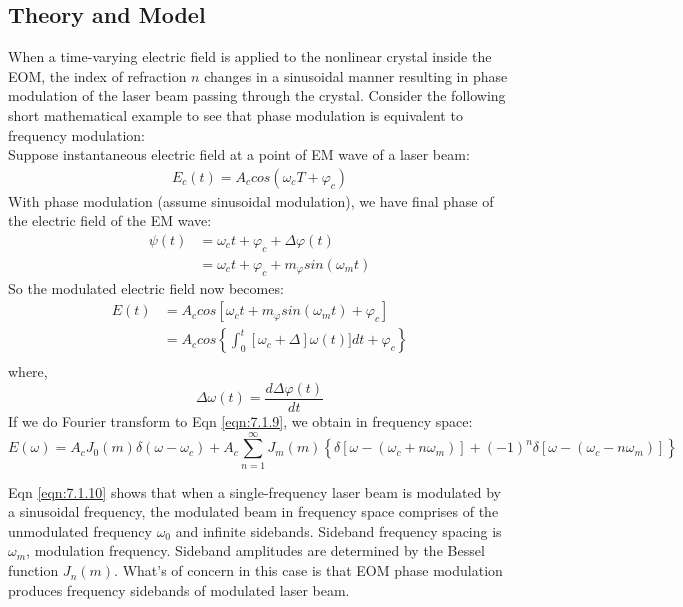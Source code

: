 \documentclass[12pt]{report}
\begin{document}
\subsection{Theory and Model}
When a time-varying electric field is applied to the nonlinear crystal inside the EOM, the index of refraction $n$ changes in a sinusoidal manner resulting in phase modulation of the laser beam passing through the crystal. Consider the following short mathematical example to see that phase modulation is equivalent to frequency modulation: 
\\
Suppose instantaneous electric field at a point of EM wave of a laser beam: 
\begin{align*}
    E_c(t) = A_c cos(\omega_c T + \varphi_c)
\end{align*}
With phase modulation (assume sinusoidal modulation), we have final phase of the electric field of the EM wave: 
\begin{align*}
    \psi(t) &= \omega_c t + \varphi_c + \Delta \varphi (t) \\
            &= \omega_c t + \varphi_c + m_{\varphi} sin(\omega_m t)
\end{align*}
So the modulated electric field now becomes: 
\begin{align}
    E(t) &= A_c cos[ \omega_c t + m_{\varphi} sin(\omega_m t) + \varphi_c] \label{eqn:7.1.9}\\
         &= A_c cos\left\{  \int_0^t [ \omega_c + \Delta ]\omega(t)] dt + \varphi_c \right\} \\
\end{align}
where, 
\begin{equation*}
    \Delta \omega (t) = \frac{d\Delta \varphi (t)}{dt}
\end{equation*}
If we do Fourier transform to Eqn \ref{eqn:7.1.9}, we obtain in frequency space: 
\begin{equation}
    E(\omega) = A_c J_0(m) \delta(\omega - \omega_c) + A_c\sum_{n=1}^\infty J_m(m) \left\{ \delta[\omega-(\omega_c + n\omega_m)] +(-1)^n\delta[\omega-(\omega_c-n\omega_m)]\right\}
    \label{eqn:7.1.10}
\end{equation}

Eqn \ref{eqn:7.1.10} shows that when a single-frequency laser beam is modulated by a sinusoidal frequency, the modulated beam in frequency space comprises of the unmodulated frequency $\omega_0$ and infinite sidebands. Sideband frequency spacing is $\omega_m$, modulation frequency. 
Sideband amplitudes are determined by the Bessel function $J_n(m)$. What's of concern in this case is that EOM phase modulation produces frequency sidebands of modulated laser beam. 
\end{document}
